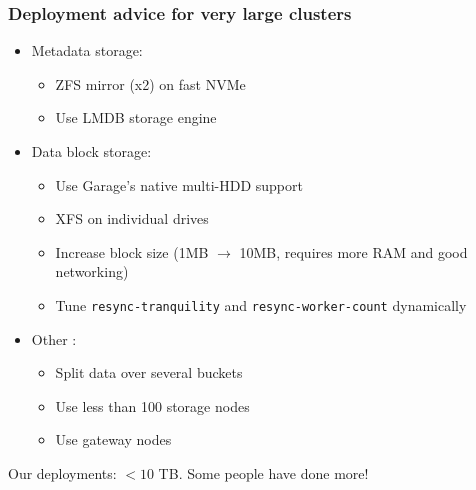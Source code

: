 \documentclass[aspectratio=169,xcolor={svgnames}]{beamer}
\begin{document}
\begin{frame}
	\frametitle{Deployment advice for very large clusters}
	\begin{itemize}
		\item Metadata storage:
			\begin{itemize}
				\item ZFS mirror (x2) on fast NVMe
				\item Use LMDB storage engine
			\end{itemize}
			\vspace{.5em}
		\item Data block storage:
			\begin{itemize}
				\item Use Garage's native multi-HDD support
				\item XFS on individual drives
				\item Increase block size (1MB $\to$ 10MB, requires more RAM and good networking)
				\item Tune \texttt{resync-tranquility} and \texttt{resync-worker-count} dynamically
			\end{itemize}
			\vspace{.5em}
		\item Other :
			\begin{itemize}
				\item Split data over several buckets
				\item Use less than 100 storage nodes
				\item Use gateway nodes
			\end{itemize}
			\vspace{.5em}
	\end{itemize}
	Our deployments: $< 10$ TB. Some people have done more!
\end{frame}


\end{document}
